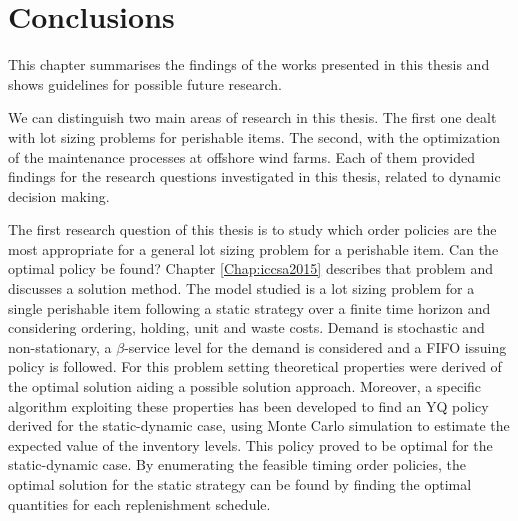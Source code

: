

\chapter{Conclusions} %
\label{Chap:Contributions}


\ifpdf
    \graphicspath{{8/figures/PNG/}{8/figures/PDF/}{8/figures/}}
\else
    \graphicspath{{8/figures/EPS/}{8/figures/}}
\fi


This chapter summarises the findings of the works presented in this thesis and shows guidelines for possible future research.

We can distinguish two main areas of research in this thesis. The first one dealt with lot sizing problems for perishable items. The second, with the optimization of the maintenance processes at offshore wind farms. Each of them provided findings for the research questions investigated in this thesis, related to dynamic decision making.

The first research question of this thesis is to study which order policies are the most appropriate for a general lot sizing problem for a perishable item. Can the optimal policy be found? Chapter \ref{Chap:iccsa2015} describes that problem and discusses a solution method. The model studied is a lot sizing problem for a single perishable item following a static strategy over a finite time horizon and considering ordering, holding, unit and waste costs. Demand is stochastic and non-stationary, a $\beta$-service level for the demand is considered and a FIFO issuing policy is followed. For this problem setting theoretical properties were derived of the optimal solution aiding a possible solution approach. Moreover, a specific algorithm exploiting these properties has been developed to find an YQ policy derived for the static-dynamic case, using Monte Carlo simulation to estimate the expected value of the inventory levels. This policy proved to be optimal for the static-dynamic case. By enumerating the feasible timing order policies, the optimal solution for the static strategy can be found by finding the optimal quantities for each replenishment schedule. 

